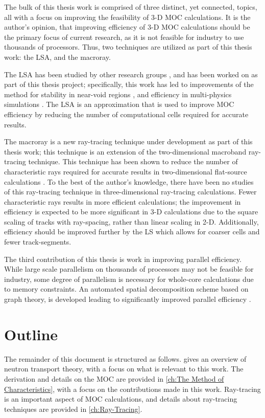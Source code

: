 {{        The bulk of this thesis work is comprised of three distinct, yet connected, topics, all with a focus on improving the feasibility of 3-D \ac{MOC} calculations.
        It is the author's opinion, that improving efficiency of 3-D \ac{MOC} calculations should be the primary focus of current research, as it is not feasible for industry to use thousands of processors.
        Thus, two techniques are utilized as part of this thesis work: the \acf{LSA}, and the macroray.

        The \ac{LSA} has been studied by other research groups \cite{Ferrer2016,Ferrer2018,Gunow2018}, and has been worked on as part of this thesis project; specifically, this work has led to improvements of the method for stability in near-void regions \cite{Fitzgerald2018}, and efficiency in multi-physics simulations \cite{Fitzgerald2019}.
        The \ac{LSA} is an approximation that is used to improve \ac{MOC} efficiency by reducing the number of computational cells required for accurate results.

        The macroray is a new ray-tracing technique under development as part of this thesis work; this technique is an extension of the two-dimensional macroband \cite{Villarino1992} ray-tracing technique.
        This technique has been shown to reduce the number of characteristic rays required for accurate results in two-dimensional flat-source calculations \cite{Yamamoto2005,Fevotte2007}.
        To the best of the author's knowledge, there have been no studies of this ray-tracing technique in three-dimensional ray-tracing calculations.
        Fewer characteristic rays results in more efficient calculations; the improvement in efficiency is expected to be more significant in 3-D calculations due to the square scaling of tracks with ray-spacing, rather than linear scaling in 2-D.
        Additionally, efficiency should be improved further by the \ac{LS} which allows for coarser cells and fewer track-segments.

        The third contribution of this thesis is work in improving parallel efficiency.
        While large scale parallelism on thousands of processors may not be feasible for industry, some degree of parallelism is necessary for whole-core calculations due to memory constraints.
        An automated spatial decomposition scheme based on graph theory, is developed leading to significantly improved parallel efficiency \cite{Fitzgerald2017,Fitzgerald2019a}.
    }
    \section{Outline}{\label{sec:Introduction:Outline}
        The remainder of this document is structured as follows.
         gives an overview of neutron transport theory, with a focus on what is relevant to this work.
        The derivation and details on the \acf{MOC} are provided in \cref{ch:The Method of Characteristics}, with a focus on the contributions made in this work.
        Ray-tracing is an important aspect of \acf{MOC} calculations, and details about ray-tracing techniques are provided in \cref{ch:Ray-Tracing}.
    }
}